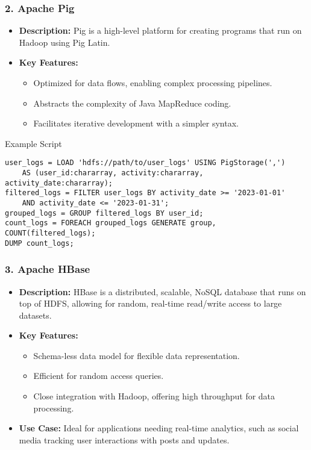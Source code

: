 \documentclass[aspectratio=169]{beamer}
\begin{document}
\begin{frame}[fragile]
    \frametitle{2. Apache Pig}
    \begin{itemize}
        \item \textbf{Description:} Pig is a high-level platform for creating programs that run on Hadoop using Pig Latin.
        \item \textbf{Key Features:}
        \begin{itemize}
            \item Optimized for data flows, enabling complex processing pipelines.
            \item Abstracts the complexity of Java MapReduce coding.
            \item Facilitates iterative development with a simpler syntax.
        \end{itemize}
    \end{itemize}
    
    \begin{block}{Example Script}
        \begin{lstlisting}[language=Pig]
user_logs = LOAD 'hdfs://path/to/user_logs' USING PigStorage(',') 
    AS (user_id:chararray, activity:chararray, activity_date:chararray);
filtered_logs = FILTER user_logs BY activity_date >= '2023-01-01' 
    AND activity_date <= '2023-01-31';
grouped_logs = GROUP filtered_logs BY user_id;
count_logs = FOREACH grouped_logs GENERATE group, COUNT(filtered_logs);
DUMP count_logs;
        \end{lstlisting}
    \end{block}
\end{frame}

\begin{frame}
    \frametitle{3. Apache HBase}
    \begin{itemize}
        \item \textbf{Description:} HBase is a distributed, scalable, NoSQL database that runs on top of HDFS, allowing for random, real-time read/write access to large datasets.
        \item \textbf{Key Features:}
        \begin{itemize}
            \item Schema-less data model for flexible data representation.
            \item Efficient for random access queries.
            \item Close integration with Hadoop, offering high throughput for data processing.
        \end{itemize}
        \item \textbf{Use Case:} Ideal for applications needing real-time analytics, such as social media tracking user interactions with posts and updates.
    \end{itemize}
\end{frame}
\end{document}
